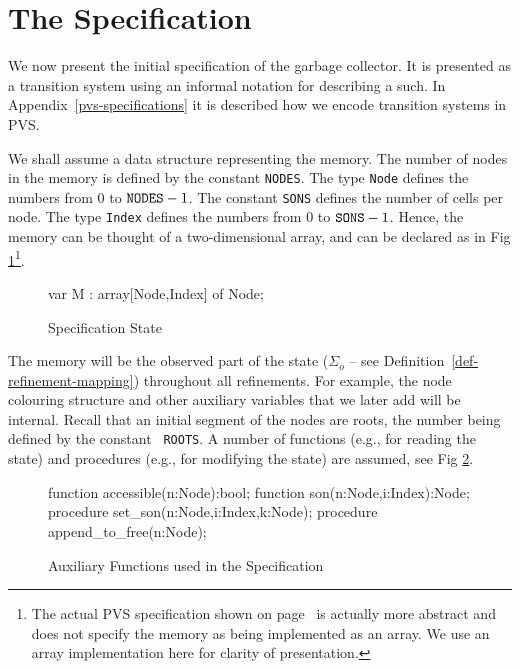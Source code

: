 
\section{The Specification}
\label{goto-specification}

We now present  the initial  specification of  the  garbage
collector.  It is  presented as a  transition  system using an informal
notation for  describing a such.   In Appendix~\ref{pvs-specifications}
it is described how we encode transition systems in PVS.

We shall assume a data  structure representing the memory.  The number
of  nodes in the  memory is defined by the  constant {\tt NODES}\@.  The
type {\tt Node} defines the numbers from $0$ to ${\tt NODES} - 1$.  The
constant {\tt  SONS} defines the number  of  cells per node.  The type
{\tt Index} defines the numbers  from $0$ to ${\tt  SONS} - 1$. Hence,
the  memory can  be  thought of a   two-dimensional array, and can  be
declared as in Fig \ref{spec-state}\footnote{The actual PVS specification shown on
page~\pageref{memory-fig} is actually more abstract and does not
specify the memory as being implemented as an array.  We use
an array implementation here for clarity of presentation. }.

\begin{figure}[htb]
\begin{smallsession}
  var
    M : array[Node,Index] of Node;
\end{smallsession}
\caption{Specification State}
\label{spec-state}
\end{figure}

The memory will be the observed part  of the state ($\Sigma_{o}$ -- see
Definition~\ref{def-refinement-mapping}) throughout all  refinements. 
For example, the node  colouring  structure and other  auxiliary variables
that we later add will be internal.  Recall that an initial segment of
the  nodes are roots, the  number  being defined by  the constant {\tt
  ROOTS}\@.   A number of functions  (e.g., for reading the  state) and
procedures (e.g., for modifying  the  state) are assumed, see Fig \ref{spec-functions}.

\begin{figure}[htb]
\begin{smallsession}
  function  accessible(n:Node):bool;
  function  son(n:Node,i:Index):Node;
  procedure set_son(n:Node,i:Index,k:Node);
  procedure append_to_free(n:Node);
\end{smallsession}
\caption{Auxiliary Functions used in the Specification}
\label{spec-functions}
\end{figure}

